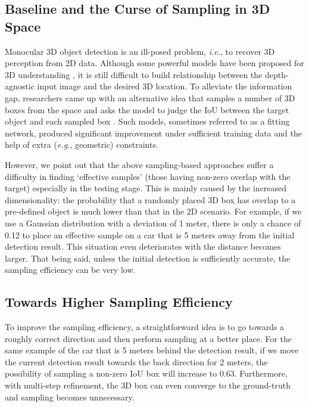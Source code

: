 \documentclass[runningheads]{llncs}
\begin{document}
\subsection{Baseline and the Curse of Sampling in 3D Space}
Monocular 3D object detection is an ill-posed problem, \textit{i.e.}, to recover 3D perception from 2D data. Although some powerful models have been proposed for 3D understanding \cite{mousavian20173d,qin2019monogrnet,brazil2019m3d}, it is still difficult to build relationship between the depth-agnostic input image and the desired 3D location. To alleviate the information gap, researchers came up with an alternative idea that samples a number of 3D boxes from the space and asks the model to judge the IoU between the target object and each sampled box \cite{liu2019deep}. Such models, sometimes referred to as a fitting network, produced significant improvement under sufficient training data and the help of extra (\textit{e.g.}, geometric) constraints.

However, we point out that the above sampling-based approaches suffer a difficulty in finding `effective samples' (those having non-zero overlap with the target) especially in the testing stage. This is mainly caused by the increased dimensionality: the probability that a randomly placed 3D box has overlap to a pre-defined object is much lower than that in the 2D scenario. For example, if we use a Gaussian distribution with a deviation of 1 meter, there is only a chance of 0.12 to place an effective sample on a car that is 5 meters away from the initial detection result. This situation even deteriorates with the distance becomes larger. That being said, unless the initial detection is sufficiently accurate, the sampling efficiency can be very low.

\subsection{Towards Higher Sampling Efficiency}

To improve the sampling efficiency, a straightforward idea is to go towards a roughly correct direction and then perform sampling at a better place. For the same example of the car that is 5 meters behind the detection result, if we move the current detection result towards the back direction for 2 meters, the possibility of sampling a non-zero IoU box will increase to 0.63. Furthermore, with multi-step refinement, the 3D box can even converge to the ground-truth and sampling becomes unnecessary. 
\end{document}
